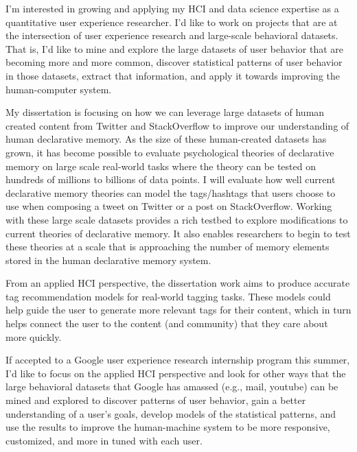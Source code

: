 \documentclass{article}
\begin{document}
I'm interested in growing and applying my HCI and data science expertise as a quantitative user experience researcher.
I'd like to work on projects that are at the intersection of user experience research and large-scale behavioral datasets.
That is, I'd like to mine and explore the large datasets of user behavior that are becoming more and more common, discover statistical patterns of user behavior in those datasets, extract that information,
and apply it towards improving the human-computer system.

My dissertation is focusing on how we can leverage large datasets of human created content from Twitter and StackOverflow to improve our understanding of human declarative memory.
As the size of these human-created datasets has grown,
it has become possible to evaluate psychological theories of declarative memory on large scale real-world tasks where the theory can be tested on hundreds of millions to billions of data points.
I will evaluate how well current declarative memory theories can model the tags/hashtags that users choose to use when composing a tweet on Twitter or a post on StackOverflow.
Working with these large scale datasets provides a rich testbed to explore modifications to current theories of declarative memory.
It also enables researchers to begin to test these theories at a scale that is approaching the number of memory elements stored in the human declarative memory system.

From an applied HCI perspective, the dissertation work aims to produce accurate tag recommendation models for real-world tagging tasks.
These models could help guide the user to generate more relevant tags for their content, which in turn helps connect the user to the content (and community) that they care about more quickly.

If accepted to a Google user experience research internship program this summer,
I'd like to focus on the applied HCI perspective and look for other ways that the large behavioral datasets that Google has amassed (e.g., mail, youtube)
can be mined and explored to discover patterns of user behavior, gain a better understanding of a user's goals, develop models of the statistical patterns, 
and use the results to improve the human-machine system to be more responsive, customized, and more in tuned with each user.
\end{document}
